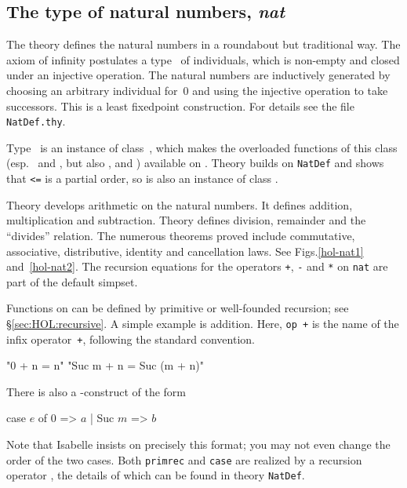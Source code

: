 \subsection{The type of natural numbers, \textit{nat}}

The theory  defines the natural numbers in a roundabout but
traditional way.  The axiom of infinity postulates a type~ of
individuals, which is non-empty and closed under an injective operation.  The
natural numbers are inductively generated by choosing an arbitrary individual
for~0 and using the injective operation to take successors.  This is a least
fixedpoint construction.  For details see the file \texttt{NatDef.thy}.

Type~ is an instance of class~, which makes the
overloaded functions of this class (esp.\ \cdx{<} and \cdx{<=}, but also
,  and ) available on .  Theory
 builds on \texttt{NatDef} and shows that {\tt<=} is a partial order,
so  is also an instance of class .

Theory  develops arithmetic on the natural numbers.  It defines
addition, multiplication and subtraction.  Theory  defines
division, remainder and the ``divides'' relation.  The numerous theorems
proved include commutative, associative, distributive, identity and
cancellation laws.  See Figs.\ts\ref{hol-nat1} and~\ref{hol-nat2}.  The
recursion equations for the operators \texttt{+}, \texttt{-} and \texttt{*} on
\texttt{nat} are part of the default simpset.

Functions on  can be defined by primitive or well-founded recursion;
see \S\ref{sec:HOL:recursive}.  A simple example is addition.
Here, \texttt{op +} is the name of the infix operator~\texttt{+}, following
the standard convention.
\begin{ttbox}
      "0 + n = n"
  "Suc m + n = Suc (m + n)"
\end{ttbox}
There is also a -construct
of the form
\begin{ttbox}
case \(e\) of 0 => \(a\) | Suc \(m\) => \(b\)
\end{ttbox}
Note that Isabelle insists on precisely this format; you may not even change
the order of the two cases.
Both \texttt{primrec} and \texttt{case} are realized by a recursion operator
, the details of which can be found in theory \texttt{NatDef}.

